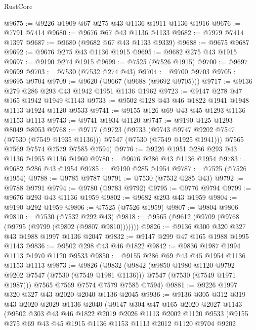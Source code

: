\begin{lexlean}{RustCore}
\begin{coremodule}
@9675 := @9226 @1909 @67 @275 @43 @1136 @1911 @1136 @1916
@9676 := @7791 @7414
@9680 := @9676 @67 @43 @1136 @1133
@9682 := @7979 @7414 @1397
@9687 := @9680 (@9682 @67 @43 @1133 @9339)
@9688 := @9675 @9687
@9692 := @9676 @275 @43 @1136 @1915
@9695 := @9682 @275 @43 @1915
@9697 := @9190 @274 @1915
@9699 := @7525 (@7526 @1915)
@9700 := @9697 @9699
@9703 := @7530 (@7532 @274 @43)
@9704 := @9700 @9703
@9705 := @9695 @9704
@9709 := @9620 (@9667 (@9688 (@9692 @9705)))
@9717 := @9136 @279 @286 @293 @43 @1942 @1951 @1136 @1962
@9723 := @9147 @278 @47 @165 @1942 @1949 @1143
@9733 := @9502 @128 @43 @46 @1822 @1941 @1948 @1113 @1924 @1120 @9533
@9741 := @9155 @126 @69 @43 @45 @1293 @1136 @1153 @1113
@9743 := @9741 @1934 @1120
@9747 := @9190 @125 @1293 @8049 @8053
@9768 := @9717
    (@9723
      (@9733
        (@9743 @9747 @9202 @7547 (@7530 (@7549 @1935 @1136)))
        @7547
        (@7530 (@7549 @1925 @1941)))
      @7565
      @7569
      @7574
      @7579
      @7585
      @7594)
@9776 := @9226 @1951 @286 @293 @43 @1136 @1955 @1136 @1960
@9780 := @9676 @286 @43 @1136 @1954
@9783 := @9682 @286 @43 @1954
@9785 := @9190 @285 @1954
@9787 := @7525 (@7526 @1954)
@9788 := @9785 @9787
@9791 := @7530 (@7532 @285 @43)
@9792 := @9788 @9791
@9794 := @9780 (@9783 @9792)
@9795 := @9776 @9794
@9799 := @9676 @293 @43 @1136 @1959
@9802 := @9682 @293 @43 @1959
@9804 := @9190 @292 @1959
@9806 := @7525 (@7526 @1959)
@9807 := @9804 @9806
@9810 := @7530 (@7532 @292 @43)
@9818 := @9565 (@9612 (@9709 (@9768 (@9795 (@9799 (@9802 (@9807 @9810)))))))
@9826 := @9136 @300 @320 @327 @43 @1988 @1997 @1136 @2047
@9832 := @9147 @299 @47 @165 @1988 @1995 @1143
@9836 := @9502 @298 @43 @46 @1822
@9842 := @9836 @1987 @1994 @1113 @1970 @1120 @9533
@9850 := @9155 @286 @69 @43 @45 @1954 @1136 @1153 @1113
@9873 := @9826
    (@9832
      (@9842
        (@9850 @1980 @1120 @9792 @9202 @7547 (@7530 (@7549 @1981 @1136)))
        @7547
        (@7530 (@7549 @1971 @1987)))
      @7565
      @7569
      @7574
      @7579
      @7585
      @7594)
@9881 := @9226 @1997 @320 @327 @43 @2020 @2040 @1136 @2045
@9936 := @9136
    @305
    @312
    @319
    @43
    @2020
    @2029
    @1136
    @2040
    (@9147
      @304
      @47
      @165
      @2020
      @2027
      @1143
      (@9502
        @303
        @43
        @46
        @1822
        @2019
        @2026
        @1113
        @2002
        @1120
        @9533
        (@9155
          @275
          @69
          @43
          @45
          @1915
          @1136
          @1153
          @1113
          @2012
          @1120
          @9704
          @9202

\end{coremodule}
\end{lexlean}
